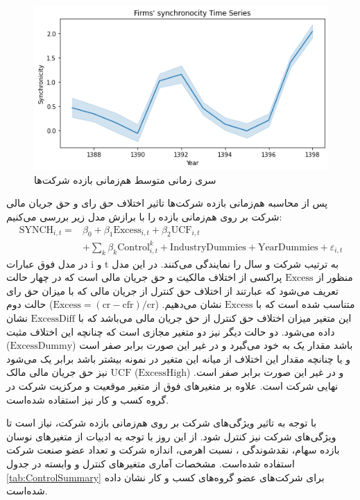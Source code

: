 \documentclass[12pt, a4paper]{article}
\begin{document}
  
  \begin{figure}[htbp]
  	\centering
  	\includegraphics[width=0.85\linewidth]{SYNCHtimeSeries}
  	\caption{سری زمانی متوسط هم‌زمانی بازده شرکت‌ها }
  	\label{fig:synchtimeseries}
  \end{figure}
  
  پس از محاسبه هم‌زمانی بازده شرکت‌ها تاثیر اختلاف حق رای و حق جریان مالی شرکت‌ بر روی هم‌زمانی بازده را با برازش مدل زیر بررسی می‌کنیم:
  \begin{equation}\label{e2}
  	\begin{split}
  		\text{SYNCH}_{i,t} =&  \beta_0 + \beta_1 \text{Excess}_{i,t} + \beta_2 \text{UCF}_{i,t} \\
  		& + \sum_{k} \beta_k \text{Control}_{i,t}^k + \text{IndustryDummies} + \text{YearDummies} + \varepsilon_{i,t}
  	\end{split}
  \end{equation}
در مدل فوق عبارات i و t به ترتیب شرکت و سال را نمایندگی می‌کنند. در این مدل منظور از 
$ \text{Excess} $
پراکسی از اختلاف مالکیت و حق جریان مالی است که در چهار حالت تعریف می‌شود که عبارتند از اختلاف حق کنترل از جریان مالی  که با میزان حق رای متناسب شده است که با 
$ \text{Excess} $
 نشان می‌دهیم.
($ \text{Excess} = (\text{cr} - \text{cfr})/\text{cr}$)  
حالت دوم این متغیر میزان اختلاف حق کنترل از حق جریان مالی می‌باشد که با 
$ \text{ExcessDiff} $
نشان داده می‌شود. دو حالت دیگر نیز دو متغیر مجازی است که چنانچه این اختلاف مثبت باشد مقدار یک به خود می‌گیرد و در غیر این صورت برابر صفر است 
 ($ \text{ExcessDummy} $)
و یا چنانچه مقدار این اختلاف از میانه این متغیر در نمونه بیشتر باشد برابر یک می‌شود و در غیر این صورت برابر صفر است.
 ($ \text{ExcessHigh} $)
$ \text{UCF} $ 
نیز حق جریان مالی مالک نهایی شرکت است. علاوه بر متغیر‌های فوق از متغیر موقعیت و مرکزیت شرکت در گروه کسب و کار نیز استفاده شده‌است.

با توجه به تاثیر ویژگی‌های شرکت بر روی هم‌زمانی بازده شرکت، نیاز است تا ویژگی‌های شرکت نیز کنترل شود. از این روز با توجه به ادبیات از متغیر‌های نوسان بازده سهام، نقدشوندگی
،
نسبت اهرمی، اندازه شرکت و تعداد عضو صنعت شرکت استفاده شده‌است. 
 مشخصات آماری متغیر‌های کنترل و وابسته در جدول 
\ref{tab:ControlSummary}
برای شرکت‌های عضو گروه‌های کسب و کار نشان داده شده‌است.
\end{document}
